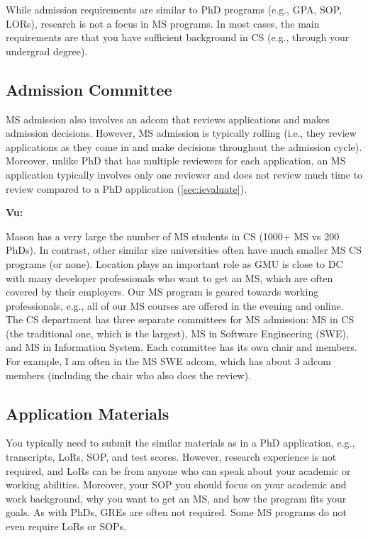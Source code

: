 \documentclass[oneside,11pt,dvipsnames]{book}
\newenvironment{commentbox}[1][]{
  \small
  \begin{mybox}
    {\small \textbf{#1}}
  }{
  \end{mybox}
}
\begin{document}
While admission requirements are similar to PhD programs (e.g., GPA, SOP, LORs), research is not a focus in MS programs. In most cases, the main requirements are that you have sufficient background in CS (e.g., through your undergrad degree). 

\subsection{Admission Committee}
MS admission also involves an adcom that reviews applications and makes admission decisions. However, MS admission is typically rolling (i.e., they review applications as they come in and make decisions throughout the admission cycle).  Moreover, unlike PhD that has multiple reviewers for each application, an MS application typically involves only one reviewer and does not review much time to review compared to a PhD application (\autoref{sec:ievaluate}). 

\begin{commentbox}[Vu:]
    Mason has a very large the number of MS students in CS (1000+ MS vs 200 PhDs). In contrast, other similar size universities often have much smaller MS CS programs (or none). Location plays an important role as GMU is close to DC with many developer professionals who want to get an MS, which are often covered by their employers.  Our MS program is geared towards working professionals, e.g., all of our MS courses are offered in the evening and online.
    \\
    
    The CS department has three separate committees for MS admission: MS in CS (the traditional one, which is the largest), MS in Software Engineering (SWE), and MS in Information System. 
    Each committee has its own chair and members. For example, I am often in the MS SWE adcom, which has about 3 adcom members (including the chair who also does the review). 
\end{commentbox}





\subsection{Application Materials}

You typically need to submit the similar materials as in a PhD application, e.g., transcripts, LoRs, SOP, and test scores.  However, research experience is not required, and LoRs can be from anyone who can speak about your academic or working abilities. Moreover, your SOP you should focus on your academic and work background, why you want to get an MS, and how the program fits your goals. As with PhDs, GREs are often not required. Some MS programs do not even require LoRs or SOPs.  
\end{document}
